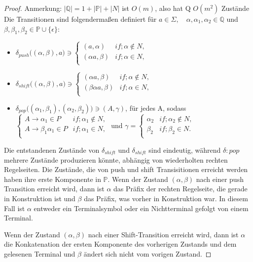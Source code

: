 \begin{proof}
Anmerkung: $|\mathbb{Q}|=1+|\mathbb{P}|+|N|$ ist $O(m)$, also hat Q $O(m^2)$ Zustände\\
Die Transitionen sind folgendermaßen definiert für $a\in \Sigma, \quad \alpha, \alpha_1, \alpha_2\in\mathbb{Q}$ und $\beta, \beta_1, \beta_2 \in \mathbb{P} \cup \{\epsilon\}$:
\begin{itemize}
\item
$\delta_{push}\big ( (\alpha, \beta),a \big )\ni 
\begin{cases}
(a, \alpha) & if; \alpha \notin N, \\
(\alpha a, \beta) & if;  \alpha \in N, \\
\end{cases}$
\item
$\delta_{shift}\big ( (\alpha, \beta),a \big )\ni 
\begin{cases}
(\alpha a, \beta) & if; \alpha \notin N, \\
(\beta\alpha a, \beta) & if;  \alpha \in N, \\
\end{cases}$
\item
$\delta_{pop}\big ( (\alpha_1, \beta_1), (\alpha_2, \beta_2) \big ) \ni (A, \gamma)$, für jedes A, sodass\\
$\begin{cases}
A\rightarrow \alpha_1\in P & if; \alpha_1 \notin N,\\
A\rightarrow \beta_1\alpha_1 \in P & if; \alpha_1 \in N,\\
\end{cases}$ und $\gamma= 
\begin{cases}
\alpha_2 & if; \alpha_2 \notin N, \\
\beta_2 & if; \beta_2 \in N. \\
\end{cases}$
\end{itemize}
Die entstandenen Zustände von $\delta_{shift}$ und $\delta_{shift}$ sind eindeutig, während $\delta:{pop}$ mehrere Zustände produzieren könnte, abhängig von wiederholten rechten Regelseiten. Die Zustände, die von push und shift Transisitionen erreicht werden haben ihre erste Komponente in $\mathbb{P}$. Wenn der Zustand $(\alpha, \beta)$ nach einer push Transition erreicht wird, dann ist $\alpha$ das Präfix der rechten Regelseite, die gerade in Konstruktion ist und $\beta$ das Präfix, was vorher in Konstruktion war. In diesem Fall ist $\alpha$ entweder ein Terminalsymbol oder ein Nichtterminal gefolgt von einem Terminal.

Wenn der Zustand $(\alpha, \beta)$ nach einer Shift-Transition erreicht wird, dann ist $\alpha$ die Konkatenation der ersten Komponente des vorherigen Zustands und dem gelesenen Terminal und $\beta$ ändert sich nicht vom vorigen Zustand.


\end{proof}
